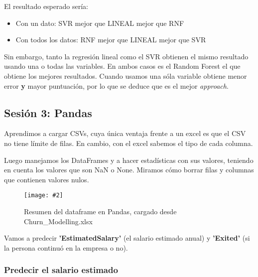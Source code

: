 \documentclass[
12pt, 
spanish, 
singlespacing,
headsepline
]{article}
\newcommand{\smallimage}[2]{
\begin{figure}[H]
	\caption{#1}
	\centering
	\texttt{[image: \#2]}
\end{figure}
}
\begin{document}
El resultado esperado sería:
\begin{itemize}
\item Con un dato: SVR mejor que LINEAL mejor que RNF
\item Con todos los datos: RNF mejor que LINEAL mejor que SVR	
\end{itemize}

Sin embargo, tanto la regresión lineal como el SVR obtienen el mismo resultado usando una o todas las variables. En ambos casos es el Random Forest el que obtiene los mejores resultados. Cuando usamos una sóla variable obtiene menor error \textbf{y} mayor puntuación, por lo que se deduce que es el mejor \textit{approach}.

\subsection{Sesión 3: Pandas}
Aprendimos a cargar CSVs, cuya única ventaja frente a un excel es que el CSV no tiene límite de filas. En cambio, con el excel sabemos el tipo de cada columna.

Luego manejamos los DataFrames y a hacer estadísticas con sus valores, teniendo en cuenta los valores que son NaN o None. Miramos cómo borrar filas y columnas que contienen valores nulos.

\smallimage{Resumen del dataframe en Pandas, cargado desde Churn\string_Modelling.xlsx}{pl2/Figure_6.png}

Vamos a predecir \textbf{'EstimatedSalary'} (el salario estimado anual) y \textbf{'Exited'}  (si la persona continuó en la empresa o no).

\subsubsection{Predecir el salario estimado}
\end{document}
